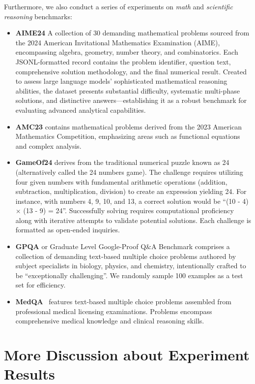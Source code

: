 Furthermore, we also conduct a series of experiments on \textit{math} and \textit{scientific reasoning} benchmarks:
\begin{itemize}[leftmargin=1em]
\item \textbf{AIME24} \citep{aops_aime} A collection of 30 demanding mathematical problems sourced from the 2024 American Invitational Mathematics Examination (AIME), encompassing algebra, geometry, number theory, and combinatorics. Each JSONL-formatted record contains the problem identifier, question text, comprehensive solution methodology, and the final numerical result. Created to assess large language models' sophisticated mathematical reasoning abilities, the dataset presents substantial difficulty, systematic multi-phase solutions, and distinctive answers—establishing it as a robust benchmark for evaluating advanced analytical capabilities.
\item \textbf{AMC23} \citep{AMC23} contains mathematical problems derived from the 2023 American Mathematics Competition, emphasizing areas such as functional equations and complex analysis.
\item \textbf{GameOf24} \citep{24game} derives from the traditional numerical puzzle known as 24 (alternatively called the 24 numbers game). The challenge requires utilizing four given numbers with fundamental arithmetic operations (addition, subtraction, multiplication, division) to create an expression yielding 24. For instance, with numbers 4, 9, 10, and 13, a correct solution would be ``(10 - 4) × (13 - 9) = 24''. Successfully solving requires computational proficiency along with iterative attempts to validate potential solutions. Each challenge is formatted as open-ended inquiries. 
\item \textbf{GPQA} or Graduate Level Google-Proof Q\&A Benchmark \citep{rein2024gpqa} comprises a collection of demanding text-based multiple choice problems authored by subject specialists in biology, physics, and chemistry, intentionally crafted to be ``exceptionally challenging''. We randomly sample 100 examples as a test set for efficiency.
\item \textbf{MedQA}~\citep{jin2021disease} features text-based multiple choice problems assembled from professional medical licensing examinations. Problems encompass comprehensive medical knowledge and clinical reasoning skills.

\end{itemize}


\clearpage
\section{More Discussion about Experiment Results}
